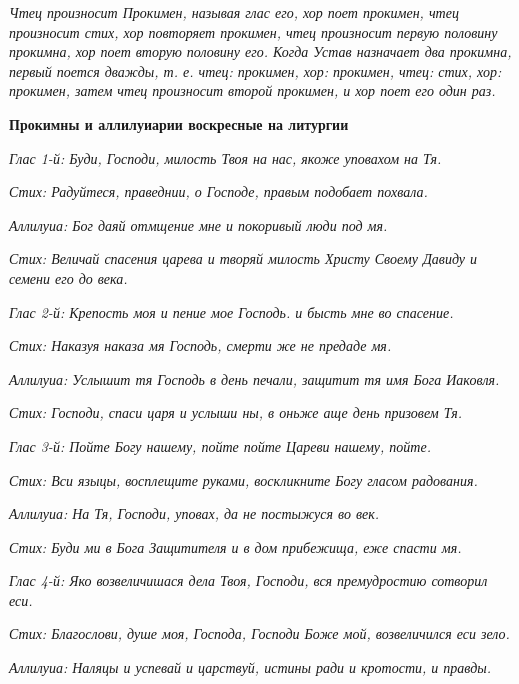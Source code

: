 \itshape Чтец произносит Прокимен, называя глас его, хор поет прокимен, чтец произносит стих, хор повторяет прокимен, чтец произносит первую половину прокимна, хор поет вторую половину его. Когда Устав назначает два прокимна, первый поется дважды, т. е. чтец: прокимен, хор: прокимен, чтец: стих, хор: прокимен, затем чтец произносит второй прокимен, и хор поет его один раз.\normalfont{}





\bfseries Прокимны и аллилуиарии воскресные на литургии\normalfont{}


\itshape Глас 1-й:\normalfont{} Буди, Господи, милость Твоя на нас, якоже уповахом на Тя.


\itshape Стих:\normalfont{} Радуйтеся, праведнии, о Господе, правым подобает похвала.


\itshape Аллилуиа:\normalfont{} Бог даяй отмщение мне и покоривый люди под мя.


\itshape Стих:\normalfont{} Величай спасения царева и творяй милость Христу Своему Давиду и семени его до века.


\itshape Глас 2-й:\normalfont{} Крепость моя и пение мое Господь. и бысть мне во спасение.


\itshape Стих:\normalfont{} Наказуя наказа мя Господь, смерти же не предаде мя.


\itshape Аллилуиа:\normalfont{} Услышит тя Господь в день печали, защитит тя имя Бога Иаковля.


\itshape Стих:\normalfont{} Господи, спаси царя и услыши ны, в оньже аще день призовем Тя.


\itshape Глас 3-й:\normalfont{} Пойте Богу нашему, пойте пойте Цареви нашему, пойте.


\itshape Стих:\normalfont{} Вси языцы, восплещите руками, воскликните Богу гласом радования.


\itshape Аллилуиа:\normalfont{} На Тя, Господи, уповах, да не постыжуся во век.


\itshape Стих:\normalfont{} Буди ми в Бога Защитителя и в дом прибежища, еже спасти мя.


\itshape Глас 4-й:\normalfont{} Яко возвеличишася дела Твоя, Господи, вся премудростию сотворил еси.


\itshape Стих:\normalfont{} Благослови, душе моя, Господа, Господи Боже мой, возвеличился еси зело.


\itshape Аллилуиа:\normalfont{} Наляцы и успевай и царствуй, истины ради и кротости, и правды.


